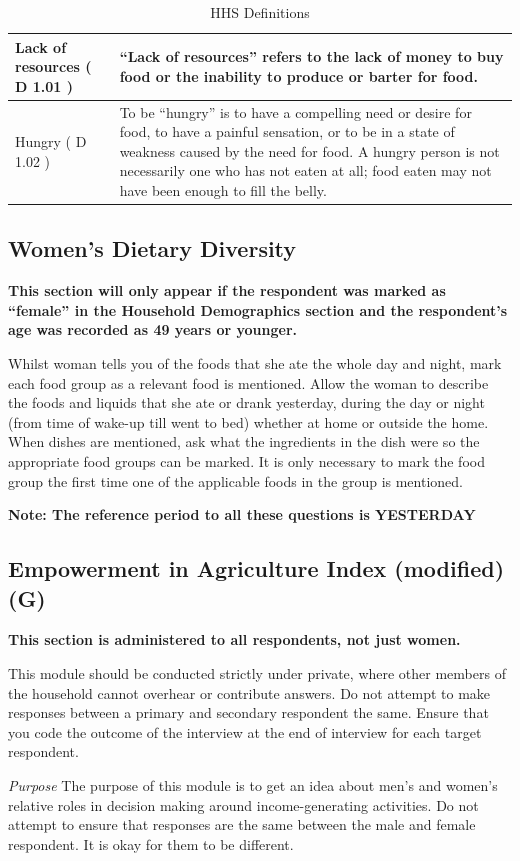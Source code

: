 \documentclass[a4paper]{refart}
\newenvironment{fulltable}[1][tbp]
 {\begin{table}[#1]%
  \hspace*{-\leftmarginwidth}%
  \begin{minipage}{\fullwidth}}
 {\end{minipage}\end{table}}
\begin{document}
\begin{fulltable}
\begin{tabularx}{\textwidth}{| X | X |}
Lack of resources ( D 1.01 ) &
``Lack of resources'' refers to the lack of money to buy food or the inability to produce or barter for food. \\ \hline
Hungry ( D 1.02 ) &
To be “hungry” is to have a compelling need or desire for food, to have a painful sensation, or to be in a state of weakness caused by the need for food. A hungry person is not necessarily one who has not eaten at all; food eaten may not have been enough to fill the belly. \\ \hline
\end{tabularx}
\caption{HHS Definitions}
\label{hhstable}
\end{fulltable}

\subsection{Women's Dietary Diversity}
\textbf{This section will only appear if the respondent was marked as ``female'' in the Household Demographics section and the respondent's age was recorded as 49 years or younger.}

Whilst woman tells you of the foods that she ate the whole day and night, mark each food group as a relevant food is mentioned. Allow the  woman to describe the foods and liquids that she ate or drank yesterday, during the day or night (from time of wake-up till went to bed) whether at home or outside the home. When dishes are mentioned, ask what the ingredients in the dish were so the appropriate food groups can be marked. It is only necessary to mark the food group the first time one of the applicable foods in the group is mentioned.

\textbf{Note: The reference period to all these questions is YESTERDAY}

\subsection{Empowerment in Agriculture Index (modified) (G)}
\textbf{This section is administered to all respondents, not just women.}

This module should be conducted strictly under private, where other members of the household cannot overhear or contribute answers. Do not attempt to make responses between a primary and secondary respondent the same. Ensure that you code the outcome of the interview at the end of interview for each target respondent.


\textit{Purpose}
The purpose of this module is to get an idea about men's and women’s relative roles in decision making around income-generating activities. Do not attempt to ensure that responses are the same between the male and female respondent. It is okay for them to be different.
\end{document}
